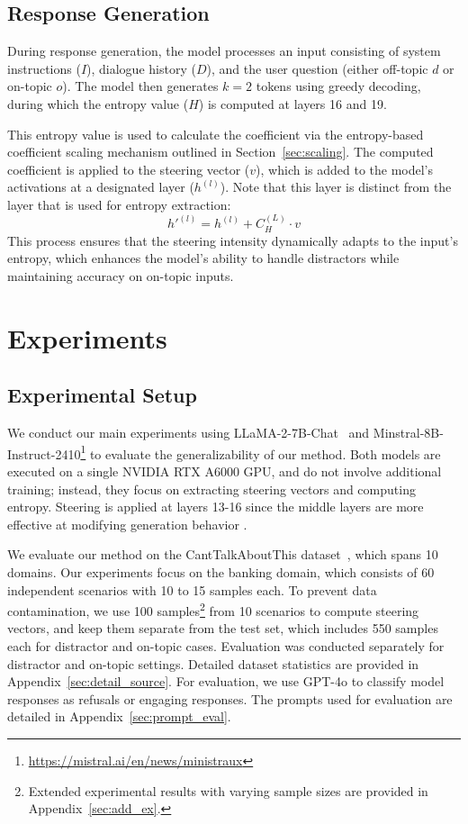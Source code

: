 \documentclass[11pt]{article}
\begin{document}
\subsection{Response Generation}
During response generation, the model processes an input consisting of system instructions (\(I\)), dialogue history (\(D\)), and the user question (either off-topic \(d\) or on-topic \(o\)). The model then generates \(k=2\) tokens using greedy decoding, during which the entropy value (\(H\)) is computed at layers 16 and 19.

This entropy value is used to calculate the coefficient via the entropy-based coefficient scaling mechanism outlined in Section~\ref{sec:scaling}. The computed coefficient is applied to the steering vector ($v$), which is added to the model's activations at a designated layer ($h^{(l)}$). Note that this layer is distinct from the layer that is used for entropy extraction:
\[
{h'}^{(l)} = h^{(l)} + C_H^{(L)}\cdot v
\]
This process ensures that the steering intensity dynamically adapts to the input's entropy, which enhances the model's ability to handle distractors while maintaining accuracy on on-topic inputs.

\section{Experiments}

\subsection{Experimental Setup}

We conduct our main experiments using LLaMA-2-7B-Chat~\cite{touvron2023llama2openfoundation} and Minstral-8B-Instruct-2410\footnote{\url{https://mistral.ai/en/news/ministraux}} to evaluate the generalizability of our method. Both models are executed on a single NVIDIA RTX A6000 GPU, and do not involve additional training; instead, they focus on extracting steering vectors and computing entropy. Steering is applied at layers 13-16 since the middle layers are more effective at modifying generation behavior \cite{rimsky-etal-2024-steering}.


We evaluate our method on the CantTalkAboutThis dataset~\cite{sreedhar-etal-2024-canttalkaboutthis}, which spans 10 domains. Our experiments focus on the banking domain, which consists of 60 independent scenarios with 10 to 15 samples each. To prevent data contamination, we use 100 samples\footnote{Extended experimental results with varying sample sizes are provided in Appendix~\ref{sec:add_ex}.} from 10 scenarios to compute steering vectors, and keep them separate from the test set, which includes 550 samples each for distractor and on-topic cases. Evaluation was conducted separately for distractor and on-topic settings. Detailed dataset statistics are provided in Appendix~\ref{sec:detail_source}. For evaluation, we use GPT-4o to classify model responses as refusals or engaging responses. The prompts used for evaluation are detailed in Appendix~\ref{sec:prompt_eval}.
\end{document}
